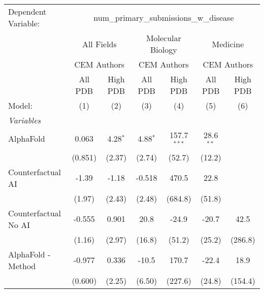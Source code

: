 \begingroup
\centering
\begin{tabular}{lcccccc}
   \tabularnewline \midrule \midrule
   Dependent Variable: & \multicolumn{6}{c}{num\_primary\_submissions\_w\_disease}\\
 & \multicolumn{2}{c}{All Fields} & \multicolumn{2}{c}{Molecular Biology} & \multicolumn{2}{c}{Medicine} \\
\cmidrule(lr){2-3} \cmidrule(lr){4-5} \cmidrule(lr){6-7}
 & \multicolumn{2}{c}{CEM Authors} & \multicolumn{2}{c}{CEM Authors} & \multicolumn{2}{c}{CEM Authors} \\
\cmidrule(lr){2-3} \cmidrule(lr){4-5} \cmidrule(lr){6-7}
 & \multicolumn{1}{c}{All PDB} & \multicolumn{1}{c}{High PDB} & \multicolumn{1}{c}{All PDB} & \multicolumn{1}{c}{High PDB} & \multicolumn{1}{c}{All PDB} & \multicolumn{1}{c}{High PDB} \\
\cmidrule(lr){2-2} \cmidrule(lr){3-3} \cmidrule(lr){4-4} \cmidrule(lr){5-5} \cmidrule(lr){6-6} \cmidrule(lr){7-7}
   Model:                                                     & (1)           & (2)        & (3)         & (4)           & (5)          & (6)\\  
   \midrule
   \emph{Variables}\\
   AlphaFold                                                  & 0.063         & 4.28$^{*}$ & 4.88$^{*}$  & 157.7$^{***}$ & 28.6$^{**}$  &   \\   
                                                              & (0.851)       & (2.37)     & (2.74)      & (52.7)        & (12.2)       &   \\   
   Counterfactual AI                                          & -1.39         & -1.18      & -0.518      & 470.5         & 22.8         &   \\   
                                                              & (1.97)        & (2.43)     & (2.48)      & (684.8)       & (51.8)       &   \\   
   Counterfactual No AI                                       & -0.555        & 0.901      & 20.8        & -24.9         & -20.7        & 42.5\\   
                                                              & (1.16)        & (2.97)     & (16.8)      & (51.2)        & (25.2)       & (286.8)\\   
   AlphaFold - Method                                         & -0.977        & 0.336      & -10.5       & 170.7         & -22.4        & 18.9\\   
                                                              & (0.600)       & (2.25)     & (6.50)      & (227.6)       & (24.8)       & (154.4)\\   

\end{tabular}
